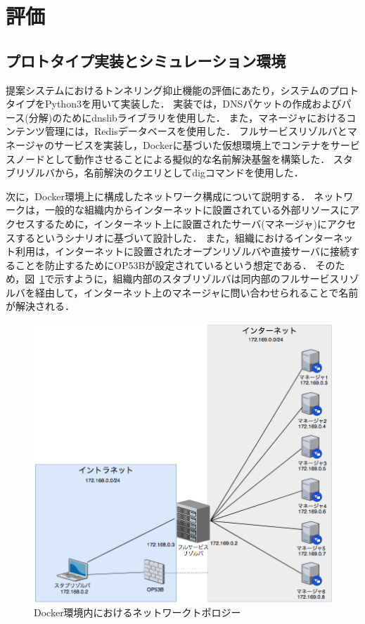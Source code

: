 \section{評価}
\label{sec:evaluation}
\subsection{プロトタイプ実装とシミュレーション環境}
\label{sec:simulation}
提案システムにおけるトンネリング抑止機能の評価にあたり，システムのプロトタイプをPython3を用いて実装した．
実装では，DNSパケットの作成およびパース(分解)のためにdnslibライブラリを使用した．
また，マネージャにおけるコンテンツ管理には，Redisデータベースを使用した．
フルサービスリゾルバとマネージャのサービスを実装し，Dockerに基づいた仮想環境上でコンテナをサービスノードとして動作させることによる擬似的な名前解決基盤を構築した．
スタブリゾルバから，名前解決のクエリとしてdigコマンドを使用した．
%

次に，Docker環境上に構成したネットワーク構成について説明する．
ネットワークは，一般的な組織内からインターネットに設置されている外部リソースにアクセスするために，インターネット上に設置されたサーバ(マネージャ)にアクセスするというシナリオに基づいて設計した．
また，組織におけるインターネット利用は，インターネットに設置されたオープンリゾルバや直接サーバに接続することを防止するためにOP53Bが設定されているという想定である．
そのため，図~\ref{fig:exp-network-topology}で示すように，組織内部のスタブリゾルバは同内部のフルサービスリゾルバを経由して，インターネット上のマネージャに問い合わせられることで名前が解決される．

\begin{figure}[htbp]
 \centering
 \includegraphics[scale=0.2]{figure/exp-network-topology.png}
 \caption[実験に用いたネットワークトポロジー]{Docker環境内におけるネットワークトポロジー}
 \label{fig:exp-network-topology}
\end{figure}

